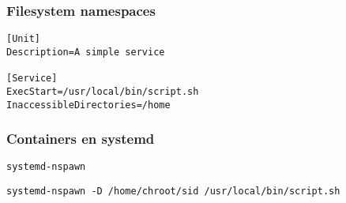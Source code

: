 \begin{frame}[fragile]
  \frametitle{Filesystem namespaces}
\begin{lstlisting}
[Unit]
Description=A simple service

[Service]
ExecStart=/usr/local/bin/script.sh
InaccessibleDirectories=/home
\end{lstlisting}
\end{frame}

\begin{frame}[fragile]
  \frametitle{Containers en systemd}
  \texttt{systemd-nspawn}
\begin{lstlisting}
systemd-nspawn -D /home/chroot/sid /usr/local/bin/script.sh
\end{lstlisting}

\end{frame}



